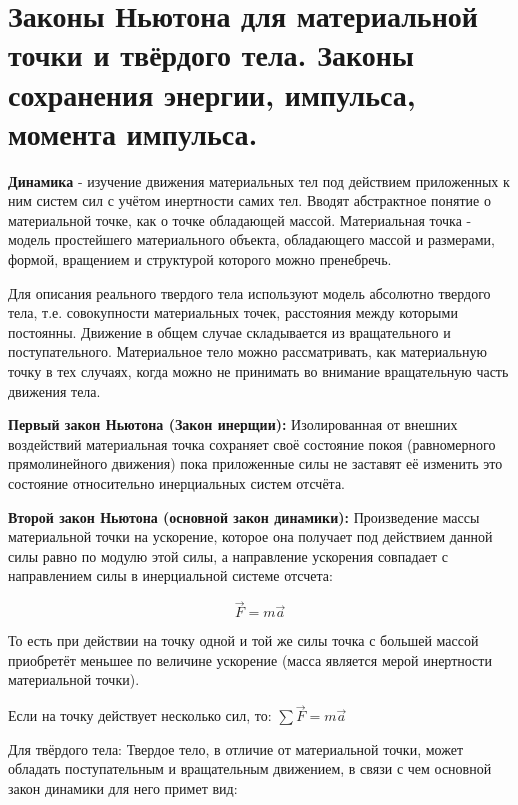 \section{Законы Ньютона для материальной точки и твёрдого тела. Законы сохранения энергии, импульса, момента импульса.}

\textbf{Динамика} - изучение движения материальных тел под действием приложенных к ним систем сил с учётом инертности самих тел. Вводят абстрактное понятие о материальной точке, как о точке обладающей массой. Материальная точка - модель простейшего материального объекта, обладающего массой и размерами, формой, вращением и структурой которого можно пренебречь.

Для описания реального твердого тела используют модель абсолютно твердого тела, т.е. совокупности материальных точек, расстояния между которыми постоянны. Движение в общем случае складывается из вращательного и поступательного. Материальное тело можно рассматривать, как материальную точку в тех случаях, когда можно не принимать во внимание вращательную часть движения тела.

\textbf{Первый закон Ньютона (Закон инерщии):}
Изолированная от внешних воздействий материальная точка сохраняет своё состояние покоя (равномерного прямолинейного движения) пока приложенные силы не заставят её изменить это состояние относительно инерциальных систем отсчёта.


\textbf{Второй закон Ньютона (основной закон динамики):}
Произведение массы материальной точки на ускорение, которое она получает под действием данной силы равно по модулю этой силы, а направление ускорения совпадает с направлением силы в инерциальной системе отсчета:

$$
\vec{F}=m \vec{a}
$$

То есть при действии на точку одной и той же силы точка с большей массой приобретёт меньшее по величине ускорение (масса является мерой инертности материальной точки).

Если на точку действует несколько сил, то: $\sum \vec{F}=m \vec{a}$

Для твёрдого тела: Твердое тело, в отличие от материальной точки, может обладать поступательным и вращательным движением, в связи с чем основной закон динамики для него примет вид:


